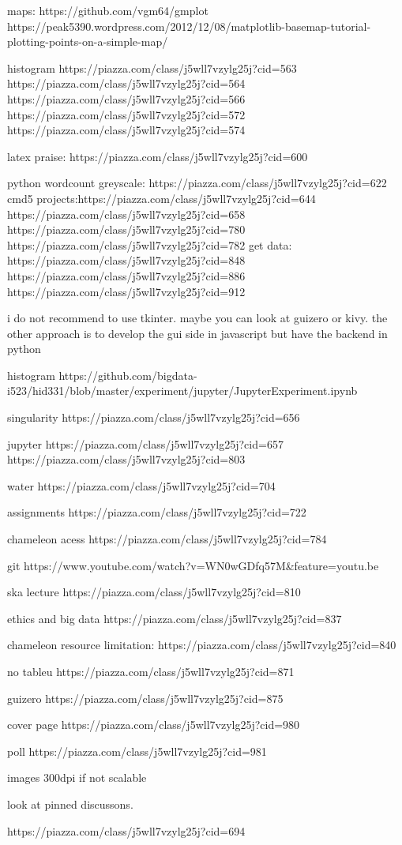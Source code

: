 maps:
https://github.com/vgm64/gmplot
https://peak5390.wordpress.com/2012/12/08/matplotlib-basemap-tutorial-plotting-points-on-a-simple-map/

 histogram
https://piazza.com/class/j5wll7vzylg25j?cid=563
https://piazza.com/class/j5wll7vzylg25j?cid=564
https://piazza.com/class/j5wll7vzylg25j?cid=566
https://piazza.com/class/j5wll7vzylg25j?cid=572
https://piazza.com/class/j5wll7vzylg25j?cid=574

latex praise:
https://piazza.com/class/j5wll7vzylg25j?cid=600

python
wordcount
greyscale: https://piazza.com/class/j5wll7vzylg25j?cid=622
cmd5 projects:https://piazza.com/class/j5wll7vzylg25j?cid=644
https://piazza.com/class/j5wll7vzylg25j?cid=658
https://piazza.com/class/j5wll7vzylg25j?cid=780
https://piazza.com/class/j5wll7vzylg25j?cid=782
get data: https://piazza.com/class/j5wll7vzylg25j?cid=848
https://piazza.com/class/j5wll7vzylg25j?cid=886
https://piazza.com/class/j5wll7vzylg25j?cid=912

i do not recommend to use tkinter. maybe you can look at guizero or kivy. the other approach is to develop the gui side in javascript but have the backend in python

histogram
https://github.com/bigdata-i523/hid331/blob/master/experiment/jupyter/JupyterExperiment.ipynb

singularity
https://piazza.com/class/j5wll7vzylg25j?cid=656

jupyter
https://piazza.com/class/j5wll7vzylg25j?cid=657
https://piazza.com/class/j5wll7vzylg25j?cid=803

water
https://piazza.com/class/j5wll7vzylg25j?cid=704

assignments
https://piazza.com/class/j5wll7vzylg25j?cid=722

chameleon acess
https://piazza.com/class/j5wll7vzylg25j?cid=784

git
https://www.youtube.com/watch?v=WN0wGDfq57M&feature=youtu.be

ska lecture
https://piazza.com/class/j5wll7vzylg25j?cid=810

ethics and big data
https://piazza.com/class/j5wll7vzylg25j?cid=837

chameleon
resource limitation: https://piazza.com/class/j5wll7vzylg25j?cid=840

no tableu
https://piazza.com/class/j5wll7vzylg25j?cid=871

guizero
https://piazza.com/class/j5wll7vzylg25j?cid=875

cover page
https://piazza.com/class/j5wll7vzylg25j?cid=980

poll
https://piazza.com/class/j5wll7vzylg25j?cid=981

images 300dpi if not scalable

look at pinned discussons.

https://piazza.com/class/j5wll7vzylg25j?cid=694